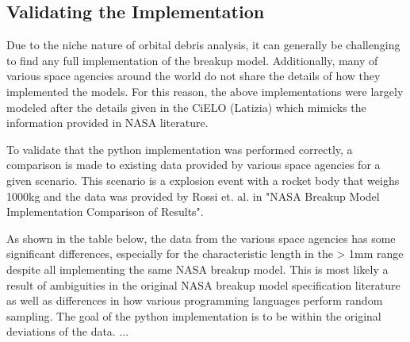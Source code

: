 \documentclass{article}
\begin{document}
\newpage
\subsection{Validating the Implementation}
Due to the niche nature of orbital debris analysis, it can generally be challenging to find any full implementation of the breakup model. Additionally, many of various space agencies around the world do not share the details of how they implemented the models. For this reason, the above implementations were largely modeled after the details given in the CiELO (Latizia) which mimicks the information provided in NASA literature.

To validate that the python implementation was performed correctly, a comparison is made to existing data provided by various space agencies for a given scenario. This scenario is a  explosion event with a rocket body that weighs 1000kg and the data was provided by Rossi et. al. in "NASA Breakup Model Implementation Comparison of Results".

As shown in the table below, the data from the various space agencies has some significant differences, especially for the characteristic length in the > 1mm range despite all implementing the same NASA breakup model. This is most likely a result of ambiguities in the original NASA breakup model specification literature as well as differences in how various programming languages perform random sampling. The goal of the python implementation is to be within the original deviations of the data. ... 
\end{document}
